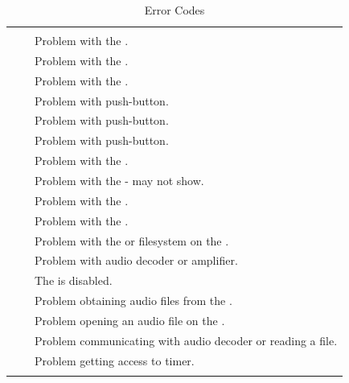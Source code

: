 \begin{longtabu} { X[1,c,m] | X[1,c,m] | X[4,l,m] | }
  \thrule

   &  &  \\ \mrule

    & 
    & Problem with the . \\ \mrule

    & 
    & Problem with the . \\ \mrule

    & 
    & Problem with the . \\ \mrule

    & 
    & Problem with  push-button. \\ \mrule

    & 
    & Problem with  push-button. \\ \mrule

    & 
    & Problem with  push-button. \\ \mrule

    & 
    & Problem with the . \\ \mrule

    & 
    & Problem with the  - may not show. \\ \mrule

    & 
    & Problem with the . \\ \mrule

    & 
    & Problem with the . \\ \mrule

    & 
    & Problem with the  or filesystem on the . \\ \mrule

    & 
    & Problem with audio decoder or amplifier. \\ \mrule

    & 
    & The  is disabled. \\ \mrule

    & 
    & Problem obtaining audio files from the . \\ \mrule

    & 
    & Problem opening an audio file on the . \\ \mrule

    & 
    & Problem communicating with audio decoder or reading a file. \\ \mrule

    & 
    & Problem getting access to timer. \\

  \bhrule
\caption{Error Codes}
\end{longtabu}

